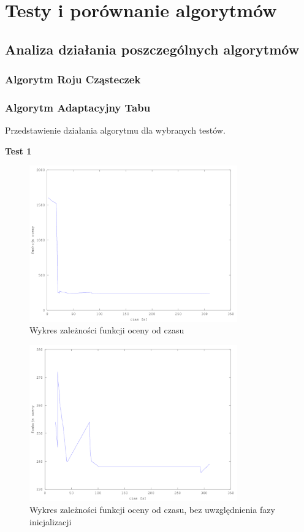\chapter{Testy i porównanie algorytmów}
\section{Analiza działania poszczególnych algorytmów}
\subsection{Algorytm Roju Cząsteczek}
\subsection{Algorytm Adaptacyjny Tabu}
Przedstawienie działania algorytmu dla wybranych testów.
\par \textbf{Test 1}
\begin{figure}[H]
  \caption{Wykres zależności funkcji oceny od czasu}
  \centering
    \includegraphics[width=0.8\textwidth]{ogolny.png}
\end{figure}
\begin{figure}[H]
  \caption{Wykres zależności funkcji oceny od czasu, bez uwzględnienia fazy inicjalizacji}
  \centering
    \includegraphics[width=0.8\textwidth]{szczeg.png}
\end{figure}
